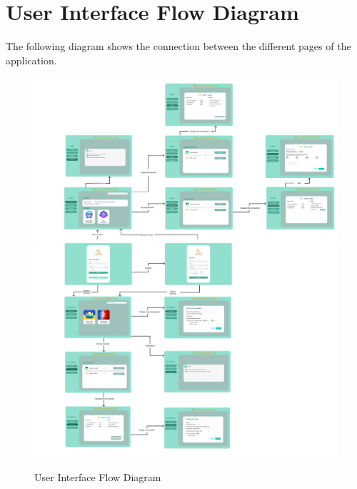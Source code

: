\section{User Interface Flow Diagram}
The following diagram shows the connection between the different pages of the application. 
\begin{figure}[H]
    \centering
    \includegraphics[width=1.15\textwidth]{images/Interface_flow_diagram2.jpg}
    \includegraphics[width=1.15\textwidth]{images/Interface_flow_diagram.jpg} 
    \caption{User Interface Flow Diagram}
\end{figure}